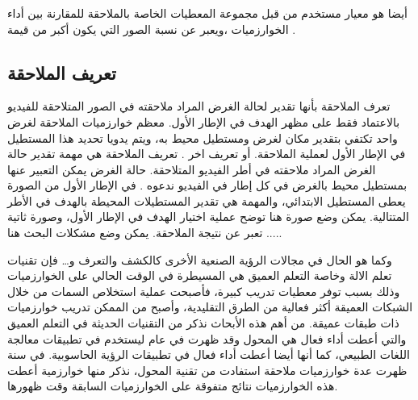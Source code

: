\documentclass[a4paper,1  pt]{report}
\begin{document}
\subsubsection{}
أيضا هو معيار مستخدم من قبل مجموعة المعطيات الخاصة بالملاحقة للمقارنة بين أداء الخوارزميات ،ويعبر عن نسبة الصور  التي يكون 
أكبر من قيمة 
.
\newline\newline
\subsection{تعريف الملاحقة}
تعرف الملاحقة بأنها تقدير لحالة الغرض المراد ملاحقته في الصور المتلاحقة للفيديو  بالاعتماد فقط على مظهر الهدف في الإطار الأول. معظم خوارزميات الملاحقة لغرض واحد تكتفي بتقدير مكان لغرض ومستطيل محيط به، ويتم يدويا تحديد هذا المستطيل في الإطار الأول لعملية الملاحقة. 
\newline
أو تعريف اخر .
تعريف الملاحقة
 هي مهمة تقدير حالة الغرض المراد ملاحقته في أطر الفيديو المتلاحقة. حالة الغرض يمكن التعبير عنها بمستطيل محيط بالغرض في كل إطار في الفيديو ندعوه
.
في الإطار الأول من الصورة يعطى المستطيل الابتدائي، والمهمة هي تقدير المستطيلات المحيطة بالهدف في الأطر المتتالية.
\newline
يمكن وضع صورة هنا توضح عملية اختيار الهدف في الإطار الأول، وصورة ثاتية تعبر عن نتيجة الملاحقة.
يمكن وضع مشكلات البحث هنا .....

 وكما هو الحال في مجالات الرؤية الصنعية الأخرى كالكشف والتعرف و… فإن تقنيات تعلم الالة وخاصة التعلم العميق هي المسيطرة في الوقت الحالي على الخوارزميات وذلك بسبب توفر معطيات تدريب كبيرة، فأصبحت عملية استخلاص السمات من خلال الشبكات العميقة أكثر فعالية من الطرق التقليدية، وأصبح من الممكن تدريب خوارزميات ذات طبقات عميقة.  من أهم هذه الأبحاث نذكر
 من التقنيات الحديثة في التعلم العميق والتي أعطت أداء فعال هي المحول
 وقد ظهرت في عام
 ليستخدم في تطبيقات معالجة اللغات الطبيعي، كما أنها أيضا أعطت أداء فعال في تطبيقات الرؤية الحاسوبية.
 في سنة
 ظهرت عدة خوارزميات ملاحقة استفادت من تقنية المحول، نذكر منها خوارزمية 
أعطت هذه الخوارزميات نتائج متفوقة على الخوارزميات السابقة وقت ظهورها.
\end{document}
